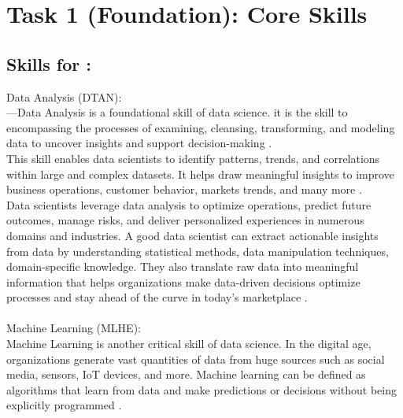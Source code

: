 \documentclass[a4paper, 11pt]{report}
\begin{document}

\tableofcontents


\newpage

\newpage
\section{Task 1 (Foundation): Core Skills}

\newpage
\subsection{Skills for \majB: \studB}
Data Analysis (DTAN):
\\[1em]
---Data Analysis is a foundational skill of data science. it is the skill to encompassing the processes of examining, cleansing, transforming, and modeling data to uncover insights and support decision-making \cite{Dtan1}.
\\[1em]
This skill enables data scientists to identify patterns, trends, and correlations within large and complex datasets. It helps draw meaningful insights to improve business operations, customer behavior, markets trends, and many more \cite{Dtan3}. 
\\[1em]
Data scientists leverage data analysis to optimize operations, predict future outcomes, manage risks, and deliver personalized experiences in numerous domains and industries. A good data scientist can extract actionable insights from data by understanding statistical methods, data manipulation techniques, domain-specific knowledge. They also translate raw data into meaningful information that helps organizations make data-driven decisions optimize processes and stay ahead of the curve in today’s marketplace \cite{Dtan2}\cite{Dtan3}.
\\[1em]
\\[1em]
\noindent Machine Learning (MLHE):
\\[1em]
Machine Learning is another critical skill of data science. In the digital age, organizations generate vast quantities of data from huge sources such as social media, sensors, IoT devices, and more. Machine learning can be defined as algorithms that learn from data and make predictions or decisions without being explicitly programmed \cite{Mlhe1}.
\end{document}
